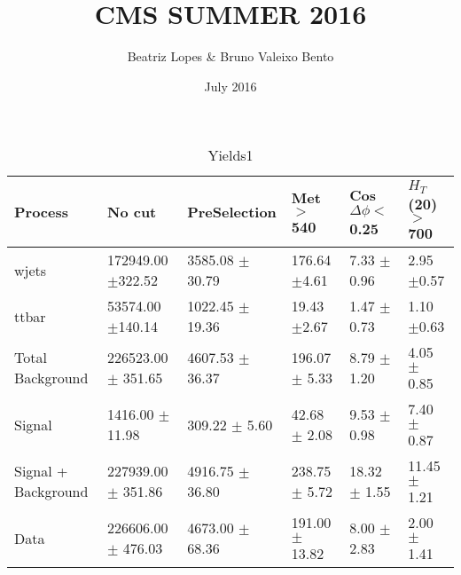 \documentclass{article}
\title{CMS SUMMER 2016}
\author{Beatriz Lopes &  Bruno Valeixo Bento}
\date{July 2016}
\begin{document}
\maketitle
\begin{table}[!h]
\begin{tabular}{llllll}
\hline
Process & No cut& PreSelection& Met $>$ 540& Cos$\Delta \phi <$ 0.25& $H_T$ (20) $>$ 700\\
\hline
wjets & 172949.00 $\pm$322.52 & 3585.08 $\pm$30.79 & 176.64 $\pm$4.61 & 7.33 $\pm$0.96 & 2.95 $\pm$0.57 \\
ttbar & 53574.00 $\pm$140.14 & 1022.45 $\pm$19.36 & 19.43 $\pm$2.67 & 1.47 $\pm$0.73 & 1.10 $\pm$0.63 \\
Total Background & 226523.00 $\pm$ 351.65 & 4607.53 $\pm$ 36.37 & 196.07 $\pm$ 5.33 & 8.79 $\pm$ 1.20 & 4.05 $\pm$ 0.85 \\
\hline
Signal & 1416.00 $\pm$ 11.98 & 309.22 $\pm$ 5.60 & 42.68 $\pm$ 2.08 & 9.53 $\pm$ 0.98 & 7.40 $\pm$ 0.87 \\
\hline
Signal + Background & 227939.00 $\pm$ 351.86 & 4916.75 $\pm$ 36.80 & 238.75 $\pm$ 5.72 & 18.32 $\pm$ 1.55 & 11.45 $\pm$ 1.21 \\
\hline
\hline
Data & 226606.00 $\pm$ 476.03 & 4673.00 $\pm$ 68.36 & 191.00 $\pm$ 13.82 & 8.00 $\pm$ 2.83 & 2.00 $\pm$ 1.41 \\
\hline
\end{tabular}
\caption{Yields1}
\end{table}
\end{document}
